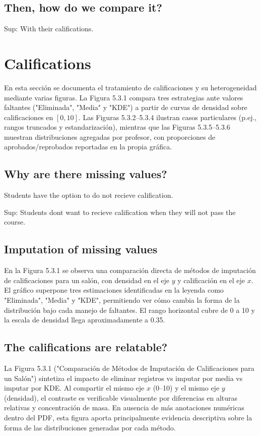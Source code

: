 \documentclass[8pt,a4paper]{article} %
\numberwithin{figure}{subsection}
\begin{document}
\subsection{Then, how do we compare it?}
Sup: With their califications.


\newpage
\section{Califications}
En esta sección se documenta el tratamiento de calificaciones y su heterogeneidad mediante varias figuras.
La Figura 5.3.1 compara tres estrategias ante valores faltantes ("Eliminada", "Media" y "KDE") a partir de curvas de densidad sobre calificaciones en $[0,10]$.
Las Figuras 5.3.2--5.3.4 ilustran casos particulares (p.ej., rangos truncados y estandarización), mientras que las Figuras 5.3.5--5.3.6 muestran distribuciones agregadas por profesor, con proporciones de aprobados/reprobados reportadas en la propia gráfica.


\subsection{Why are there missing values?}
Students have the option to do not recieve calification.

Sup: Students dont want to recieve calification when they will not pass the course.

\subsection{Imputation of missing values}
En la Figura 5.3.1 se observa una comparación directa de métodos de imputación de calificaciones para un salón, con densidad en el eje $y$ y calificación en el eje $x$.
El gráfico superpone tres estimaciones identificadas en la leyenda como "Eliminada", "Media" y "KDE", permitiendo ver cómo cambia la forma de la distribución bajo cada manejo de faltantes.
El rango horizontal cubre de 0 a 10 y la escala de densidad llega aproximadamente a 0.35.


\subsection{The califications are relatable?}
La Figura 5.3.1 ("Comparación de Métodos de Imputación de Calificaciones para un Salón") sintetiza el impacto de eliminar registros vs imputar por media vs imputar por KDE.
Al compartir el mismo eje $x$ (0--10) y el mismo eje $y$ (densidad), el contraste es verificable visualmente por diferencias en alturas relativas y concentración de masa.
En ausencia de más anotaciones numéricas dentro del PDF, esta figura aporta principalmente evidencia descriptiva sobre la forma de las distribuciones generadas por cada método.
\end{document}
